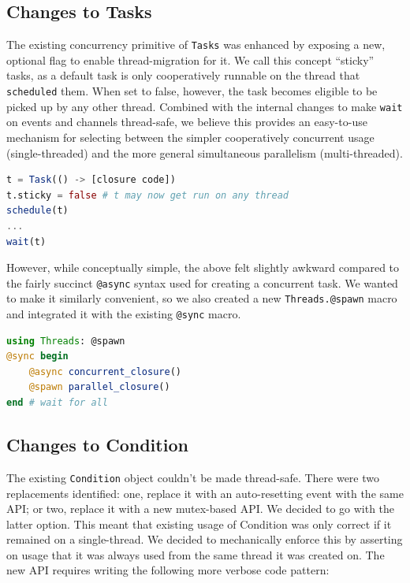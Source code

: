 \documentclass{juliacon}
\begin{document}
\subsection{Changes to Tasks}
\label{subsub:integration-tasks}

The existing concurrency primitive of \verb|Tasks| was enhanced by exposing a new, optional flag to enable thread-migration for it. We call this concept ``sticky'' tasks, as a default task is only cooperatively runnable on the thread that \verb|scheduled| them. When set to false, however, the task becomes eligible to be picked up by any other thread. Combined with the internal changes to make \verb|wait| on events and channels thread-safe, we believe this provides an easy-to-use mechanism for selecting between the simpler cooperatively concurrent usage (single-threaded) and the more general simultaneous parallelism (multi-threaded).

\begin{lstlisting}[language = Julia]
t = Task(() -> [closure code])
t.sticky = false # t may now get run on any thread
schedule(t)
...
wait(t)
\end{lstlisting}

However, while conceptually simple, the above felt slightly awkward compared to the fairly succinct \verb|@async| syntax used for creating a concurrent task. We wanted to make it similarly convenient, so we also created a new \verb|Threads.@spawn| macro and integrated it with the existing \verb|@sync| macro.

\begin{lstlisting}[language = Julia]
using Threads: @spawn
@sync begin
    @async concurrent_closure()
    @spawn parallel_closure()
end # wait for all
\end{lstlisting}

\subsection{Changes to Condition}
\label{subsub:integration-condition}

The existing \verb|Condition| object couldn't be made thread-safe. There were two replacements identified: one, replace it with an auto-resetting event with the same API; or two, replace it with a new mutex-based API. We decided to go with the latter option. This meant that existing usage of Condition was only correct if it remained on a single-thread. We decided to mechanically enforce this by asserting on usage that it was always used from the same thread it was created on. The new API requires writing the following more verbose code pattern:
\end{document}
